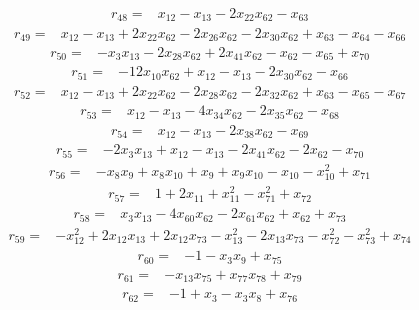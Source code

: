 \[\begin{aligned}
r_{48}={}&x_{12}-x_{13}-2x_{22}x_{62}-x_{63}
\end{aligned}\]
\[\begin{aligned}
r_{49}={}&x_{12}-x_{13}+2x_{22}x_{62}-2x_{26}x_{62}-2x_{30}x_{62}+x_{63}-x_{64}-x_{66}
\end{aligned}\]
\[\begin{aligned}
r_{50}={}&-x_{3}x_{13}-2x_{28}x_{62}+2x_{41}x_{62}-x_{62}-x_{65}+x_{70}
\end{aligned}\]
\[\begin{aligned}
r_{51}={}&-12x_{10}x_{62}+x_{12}-x_{13}-2x_{30}x_{62}-x_{66}
\end{aligned}\]
\[\begin{aligned}
r_{52}={}&x_{12}-x_{13}+2x_{22}x_{62}-2x_{28}x_{62}-2x_{32}x_{62}+x_{63}-x_{65}-x_{67}
\end{aligned}\]
\[\begin{aligned}
r_{53}={}&x_{12}-x_{13}-4x_{34}x_{62}-2x_{35}x_{62}-x_{68}
\end{aligned}\]
\[\begin{aligned}
r_{54}={}&x_{12}-x_{13}-2x_{38}x_{62}-x_{69}
\end{aligned}\]
\[\begin{aligned}
r_{55}={}&-2x_{3}x_{13}+x_{12}-x_{13}-2x_{41}x_{62}-2x_{62}-x_{70}
\end{aligned}\]
\[\begin{aligned}
r_{56}={}&-x_{8}x_{9}+x_{8}x_{10}+x_{9}+x_{9}x_{10}-x_{10}-x_{10}^{2}+x_{71}
\end{aligned}\]
\[\begin{aligned}
r_{57}={}&1+2x_{11}+x_{11}^{2}-x_{71}^{2}+x_{72}
\end{aligned}\]
\[\begin{aligned}
r_{58}={}&x_{3}x_{13}-4x_{60}x_{62}-2x_{61}x_{62}+x_{62}+x_{73}
\end{aligned}\]
\[\begin{aligned}
r_{59}={}&-x_{12}^{2}+2x_{12}x_{13}+2x_{12}x_{73}-x_{13}^{2}-2x_{13}x_{73}-x_{72}^{2}-x_{73}^{2}+x_{74}
\end{aligned}\]
\[\begin{aligned}
r_{60}={}&-1-x_{3}x_{9}+x_{75}
\end{aligned}\]
\[\begin{aligned}
r_{61}={}&-x_{13}x_{75}+x_{77}x_{78}+x_{79}
\end{aligned}\]
\[\begin{aligned}
r_{62}={}&-1+x_{3}-x_{3}x_{8}+x_{76}
\end{aligned}\]

